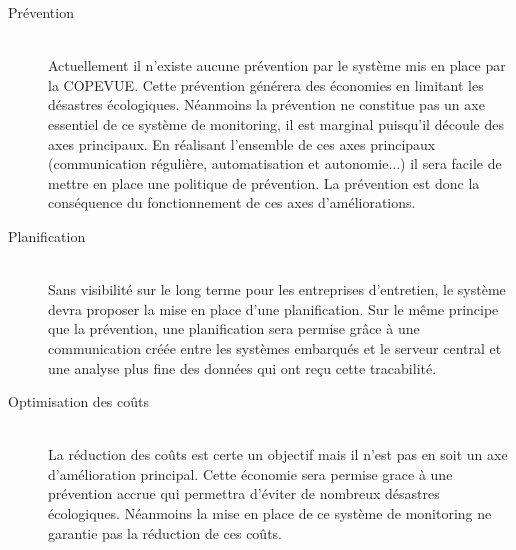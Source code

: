 \begin{description}
	\item[Prévention]\hfill\\

	Actuellement il n'existe aucune prévention par le système mis en
	place par la COPEVUE. Cette prévention générera des économies en
	limitant les désastres écologiques. Néanmoins la prévention ne
	constitue pas un axe essentiel de ce système de monitoring, il est
	marginal puisqu'il découle des axes principaux. En réalisant
	l'ensemble de ces axes principaux (communication régulière,
	automatisation et autonomie...) il sera facile de mettre en place
	une politique de prévention. La prévention est donc la conséquence
	du fonctionnement de ces axes d'améliorations.

	\item[Planification]\hfill\\

	Sans visibilité sur le long terme pour les entreprises d'entretien,
	le système devra proposer la mise en place d'une planification. Sur
	le même principe que la prévention, une planification sera permise
	grâce à une communication créée entre les systèmes embarqués et le
	serveur central et une analyse plus fine des données qui ont reçu
	cette tracabilité.

	\item[Optimisation des coûts]\hfill\\

	La réduction des coûts est certe un objectif mais il n'est pas en
	soit un axe d'amélioration principal. Cette économie sera permise
	grace à une prévention accrue qui permettra d'éviter de nombreux
	désastres écologiques. Néanmoins la mise en place de ce système de
	monitoring ne garantie pas la réduction de ces coûts.

\end{description}
